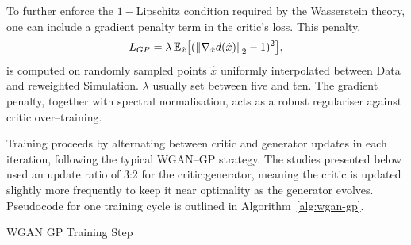 {{        To further enforce the \(1-\)Lipschitz condition required by the Wasserstein theory, one can include a gradient penalty term in the critic’s loss.
        This penalty,
        \[
            L_{GP} = \lambda\,\mathbb{E}_{\hat{x}}\qty[(\norm{\nabla_{\hat{x}}d(\hat{x})}_2 - 1)^2],
        \]
        is computed on randomly sampled points $\hat{x}$ uniformly interpolated between Data and reweighted Simulation.
        $\lambda$ usually set between five and ten.
        The gradient penalty, together with spectral normalisation, acts as a robust regulariser against critic over--training.

        Training proceeds by alternating between critic and generator updates in each iteration, following the typical WGAN--GP strategy.
        The studies presented below used an update ratio of 3:2 for the critic:generator, meaning the critic is updated slightly more frequently to keep it near optimality as the generator evolves.
        Pseudocode for one training cycle is outlined in Algorithm~\ref{alg:wgan-gp}.

        \begin{algorithm}
            \caption{WGAN GP Training Step}
            \label{alg:wgan-gp}
\end{algorithm}}}
